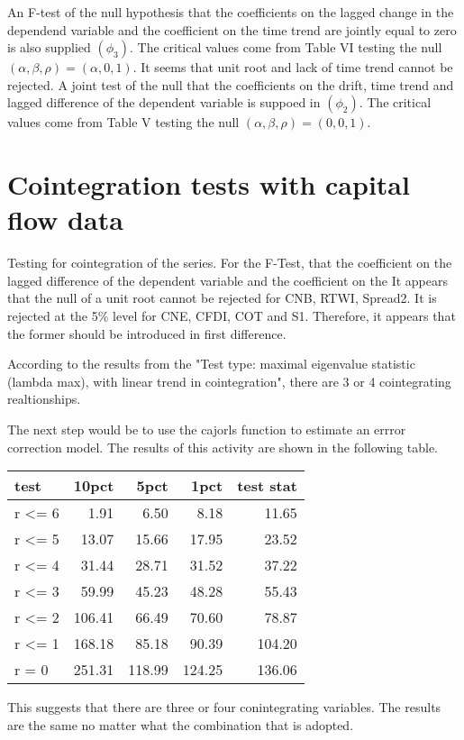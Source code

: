 \documentclass{article}\usepackage{graphicx, color}
\begin{document}
An F-test of the null hypothesis that the coefficients on the lagged change in the dependend variable and the coefficient on the time trend are jointly equal to zero is also supplied $(\phi_3)$.  The critical values come from Table VI \citep{DF1981} testing the null $(\alpha, \beta, \rho) = (\alpha, 0, 1)$.  It seems that unit root and lack of time trend cannot be rejected. A joint test of the null that the coefficients on the drift, time trend and lagged difference of the dependent variable is suppoed in $(\phi_2)$.  The critical values come from Table V \citep{DF1981} testing the null $(\alpha, \beta, \rho) = (0, 0, 1)$.



\section{Cointegration tests with capital flow data}
Testing for cointegration of the series.  For the F-Test, that the coefficient on the lagged difference of the dependent variable and the coefficient on the It appears that the null of a unit root cannot be rejected for CNB, RTWI, Spread2. It is rejected at the 5\% level for CNE, CFDI, COT and S1.  Therefore, it appears that the former should be introduced in first difference. 



According to the results from the "Test type: maximal eigenvalue statistic (lambda max), with linear trend in cointegration", there are 3 or 4 cointegrating realtionships.  


The next step would be to use the cajorls function to estimate an errror correction model. The results of this activity are shown in the following table.

\begin{tabular}{l | r r r r}
test  & 10pct   &   5pct &   1pct & test stat\\
\hline
r <= 6 &   1.91 &  6.50  & 8.18   & 11.65\\
r <= 5 &  13.07 & 15.66  & 17.95  & 23.52\\
r <= 4 &  31.44 & 28.71  & 31.52  & 37.22\\
r <= 3 &  59.99 & 45.23  & 48.28  & 55.43\\
r <= 2 & 106.41 & 66.49  & 70.60  & 78.87\\
r <= 1 & 168.18 & 85.18  & 90.39  & 104.20\\
r = 0  & 251.31 & 118.99 & 124.25 & 136.06\\
\end{tabular}

This suggests that there are three or four conintegrating variables.  The results are the same no matter what the combination that is adopted.  
\end{document}
